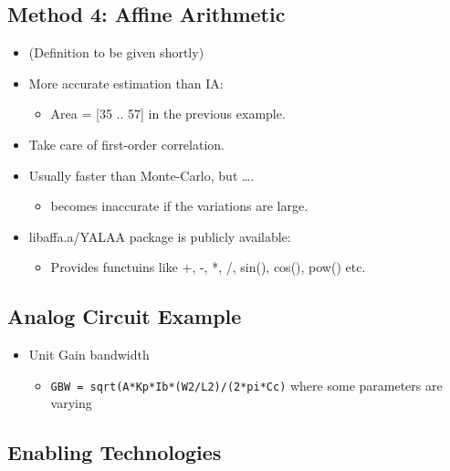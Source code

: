 \documentclass[
]{article}
\providecommand{\tightlist}{%
  \setlength{\itemsep}{0pt}\setlength{\parskip}{0pt}}
\begin{document}
\hypertarget{method-4-affine-arithmetic}{%
\subsection{Method 4: Affine Arithmetic}\label{method-4-affine-arithmetic}}

\begin{itemize}
\tightlist
\item
  (Definition to be given shortly)
\item
  More accurate estimation than IA:

  \begin{itemize}
  \tightlist
  \item
    Area = {[}35 .. 57{]} in the previous example.
  \end{itemize}
\item
  Take care of first-order correlation.
\item
  Usually faster than Monte-Carlo, but \ldots.

  \begin{itemize}
  \tightlist
  \item
    becomes inaccurate if the variations are large.
  \end{itemize}
\item
  libaffa.a/YALAA package is publicly available:

  \begin{itemize}
  \tightlist
  \item
    Provides functuins like +, -, *, /, sin(), cos(), pow() etc.
  \end{itemize}
\end{itemize}

\hypertarget{analog-circuit-example}{%
\subsection{Analog Circuit Example}\label{analog-circuit-example}}

\begin{itemize}
\tightlist
\item
  Unit Gain bandwidth

  \begin{itemize}
  \tightlist
  \item
    \texttt{GBW\ =\ sqrt(A*Kp*Ib*(W2/L2)/(2*pi*Cc)} where some parameters are varying
  \end{itemize}
\end{itemize}

\hypertarget{enabling-technologies}{%
\subsection{Enabling Technologies}\label{enabling-technologies}}
\end{document}
